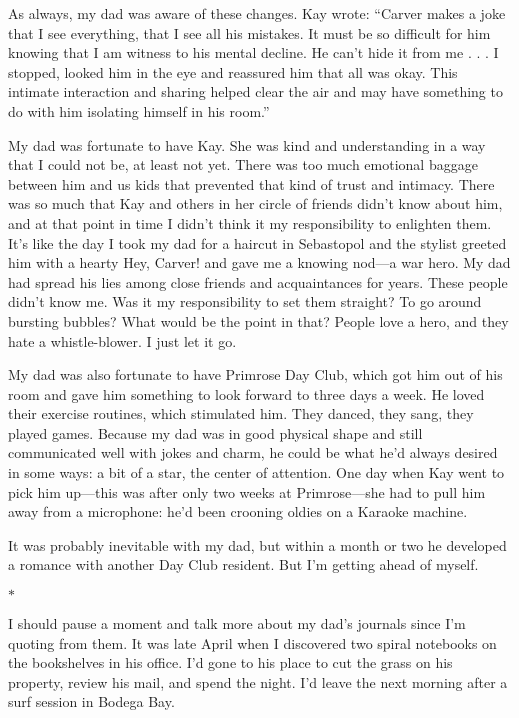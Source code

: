 \documentclass[12pt]{book}
\begin{document}
As always, my dad was aware of these changes. Kay wrote: ``Carver makes a joke that I see everything, that I see all his mistakes. It must be so difficult for him knowing that I am witness to his mental decline. He can't hide it from me . . . I stopped, looked him in the eye and reassured him that all was okay. This intimate interaction and sharing helped clear the air and may have something to do with him isolating himself in his room.''

My dad was fortunate to have Kay. She was kind and understanding in a way that I could not be, at least not yet. There was too much emotional baggage between him and us kids that prevented that kind of trust and intimacy. There was so much that Kay and others in her circle of friends didn't know about him, and at that point in time I didn't think it my responsibility to enlighten them. It's like the day I took my dad for a haircut in Sebastopol and the stylist greeted him with a hearty Hey, Carver! and gave me a knowing nod---a war hero. My dad had spread his lies among close friends and acquaintances for years. These people didn't know me. Was it my responsibility to set them straight? To go around bursting bubbles? What would be the point in that? People love a hero, and they hate a whistle-blower. I just let it go.

My dad was also fortunate to have Primrose Day Club, which got him out of his room and gave him something to look forward to three days a week. He loved their exercise routines, which stimulated him. They danced, they sang, they played games. Because my dad was in good physical shape and still communicated well with jokes and charm, he could be what he'd always desired in some ways: a bit of a star, the center of attention. One day when Kay went to pick him up---this was after only two weeks at Primrose---she had to pull him away from a microphone: he'd been crooning oldies on a Karaoke machine.

It was probably inevitable with my dad, but within a month or two he developed a romance with another Day Club resident. But I'm getting ahead of myself.

\begin{center}$*$\end{center}

I should pause a moment and talk more about my dad's journals since I'm quoting from them. It was late April when I discovered two spiral notebooks on the bookshelves in his office. I'd gone to his place to cut the grass on his property, review his mail, and spend the night. I'd leave the next morning after a surf session in Bodega Bay.
\end{document}
